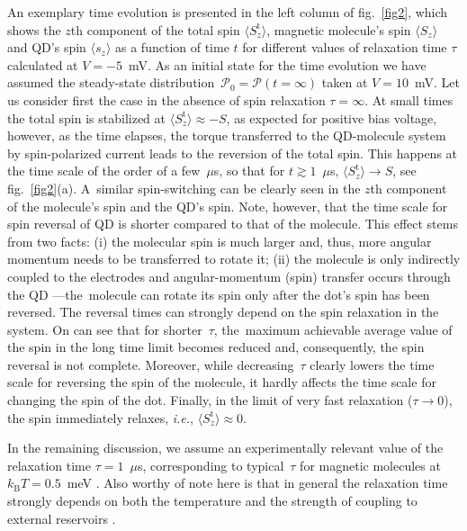 \documentclass[doublecol]{epl2} %
\newcommand{\prob}{\mathcal{P}}
\newcommand{\ie}{\emph{i.e.}\xspace}
\begin{document}
An exemplary time evolution is presented in the left column of fig.~\ref{fig2},
which shows the $z$th component of the total spin $\langle S_z^\text{t} \rangle$,
magnetic molecule's spin $\langle S_z \rangle$ 
and QD's spin $\langle s_z \rangle$ as a function of time $t$
for different values of relaxation time $\tau$ calculated at \mbox{$V=-5$}~mV.
As an initial state for the time evolution we have assumed the steady-state
distribution\mbox{ $\bm{\prob}_0 = \bm{\prob}(t=\infty)$} taken at \mbox{$V = 10$}~mV.
Let us consider first the case in the absence of spin relaxation \mbox{$\tau =\infty$}.
At small times the total spin is stabilized at 
\mbox{$ \langle S_z^\text{t} \rangle \approx -S$}, as expected for positive bias voltage,
however, as the time elapses, the torque transferred to the QD-molecule
system by spin-polarized current leads to the reversion of the total spin.
This happens at the time scale of the order of a few~$\mu$s,
so that for \mbox{$t\gtrsim 1$}~$\mu$s, \mbox{$ \langle S_z^\text{t} \rangle \to S$},
see fig.~\ref{fig2}(a). A~similar spin-switching
can be clearly seen in the $z$th component of the molecule's
spin and the QD's spin. Note, however, that the time
scale for spin reversal of QD is shorter
compared to that of the molecule.
This effect stems from two facts: (i) the molecular
spin is much larger and, thus, more angular momentum needs to be transferred to rotate it;
 (ii) the molecule is only indirectly coupled to the electrodes and angular-momentum (spin) transfer
occurs through the QD ---the~molecule can rotate its spin only after the dot's spin has been reversed.
The reversal times can strongly depend on the spin relaxation
in the system. On can see that for shorter~$\tau$,
the~maximum achievable average value of the spin in the long time limit becomes reduced and,
consequently, the spin reversal is not complete.
Moreover, while decreasing~$\tau$ clearly lowers the time scale for
reversing the spin of the molecule, it hardly affects 
the time scale for changing the spin of the dot.
Finally, in the limit of very fast relaxation (\mbox{$\tau\to 0$}),
the spin immediately relaxes, \ie, \mbox{$\langle S_z^\text{t} \rangle \approx 0$}.

In the remaining discussion, we assume an experimen\-tally relevant value of the relaxation
time \mbox{$\tau = 1$}~$\mu$s, cor\-re\-sponding to typical~$\tau$ for magnetic molecules
at \mbox{$k_\text{B} T=0.5$}~meV \cite{Schlegel2008Oct}.
Also worthy of note here  is that in general the relaxation time strongly depends on both the temperature
and the strength of coupling to external reservoirs
\cite{Bahr2008Feb,Loubens2008Jul,Rastelli2009Mar,Takahashi2009Feb,Takahashi2011Aug}.
\end{document}
